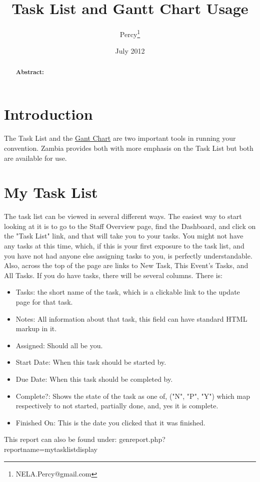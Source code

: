 \documentclass[captions=tablesignature]{scrartcl}
\author{Percy\thanks{NELA.Percy@gmail.com}}
\date{July 2012}
\title{Task List and Gantt Chart Usage}
\begin{document}
\maketitle
{}
\thispagestyle{fancy}
\renewcommand{\headrulewidth}{0pt}
\renewcommand{\footrulewidth}{0pt}
\lhead{}
\rhead{}
\chead{}
\lfoot{}
\cfoot{}
\rfoot{}
\begin{abstract}
\vspace{5cm}
{\LARGE{\textbf{Abstract:\\}}}

\end{abstract}
\newpage
\renewcommand{\headrulewidth}{1pt}
\renewcommand{\footrulewidth}{1pt}
\rfoot{\thepage}
\setcounter{tocdepth}{3}
\tableofcontents
\listoftables
\listoffigures
\newpage
{}
\section{Introduction}
\label{sec-1}
The Task List and the \href{http://en.wikipedia.org/wiki/Gantt_chart}{Gant Chart} are two important tools in running
your convention.  Zambia provides both with more emphasis on the
Task List but both are available for use.

\section{My Task List}
\label{sec-2}
The task list can be viewed in several different ways.  The easiest
way to start looking at it is to go to the Staff Overview page, find
the Dashboard, and click on the "Task List" link, and that will take
you to your tasks.  You might not have any tasks at this time,
which, if this is your first exposure to the task list, and you have
not had anyone else assigning tasks to you, is perfectly
understandable.  Also, across the top of the page are links to New
Task, This Event's Tasks, and All Tasks. If you do have tasks, there
will be several columns.  There is:
\begin{itemize}
\item Tasks: the short name of the task, which is a clickable link to
the update page for that task.
\item Notes: All information about that task, this field can have
standard HTML markup in it.
\item Assigned: Should all be you.
\item Start Date: When this task should be started by.
\item Due Date: When this task should be completed by.
\item Complete?: Shows the state of the task as one of, ("N", "P", "Y")
which map respectively to not started, partially done, and, yes it
is complete.
\item Finished On: This is the date you clicked that it was finished.
\end{itemize}
This report can also be found under:
genreport.php?reportname=mytasklistdisplay
\end{document}
